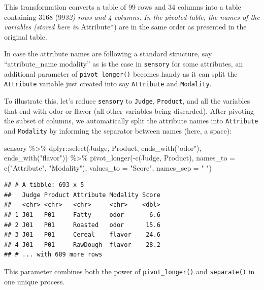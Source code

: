 \documentclass[
]{krantz}
\makeatletter
\newenvironment{Shaded}{\begin{snugshade}}{\end{snugshade}}
\newcommand{\AttributeTok}[1]{\textcolor[rgb]{0.61,0.61,0.61}{#1}}
\newcommand{\FunctionTok}[1]{\textcolor[rgb]{0,0,0}{#1}}
\newcommand{\NormalTok}[1]{#1}
\newcommand{\SpecialCharTok}[1]{\textcolor[rgb]{0,0,0}{#1}}
\newcommand{\StringTok}[1]{\textcolor[rgb]{0.5,0.5,0.5}{#1}}
\newenvironment{kframe}{%
\medskip{}
\setlength{\fboxsep}{.8em}
 \def\at@end@of@kframe{}%
 \ifinner\ifhmode%
  \def\at@end@of@kframe{\end{minipage}}%
  \begin{minipage}{\columnwidth}%
 \fi\fi%
 \def\FrameCommand##1{\hskip\@totalleftmargin \hskip-\fboxsep
 \colorbox{shadecolor}{##1}\hskip-\fboxsep
     \hskip-\linewidth \hskip-\@totalleftmargin \hskip\columnwidth}%
 \MakeFramed {\advance\hsize-\width
   \@totalleftmargin\z@ \linewidth\hsize
   \@setminipage}}%
 {\par\unskip\endMakeFramed%
 \at@end@of@kframe}
\renewenvironment{Shaded}{\begin{kframe}}{\end{kframe}}
\makeatother
\begin{document}
This transformation converts a table of 99 rows and 34 columns into a table containing 3168 (99\emph{32) rows and 4 columns.
In the pivoted table, the names of the variables (stored here in }Attribute*) are in the same order as presented in the original table.

In case the attribute names are following a standard structure, say ``attribute\_name modality'' as is the case in \texttt{sensory} for some attributes, an additional parameter of \texttt{pivot\_longer()} becomes handy as it can split the \texttt{Attribute} variable just created into say \texttt{Attribute} and \texttt{Modality}.

To illustrate this, let's reduce \texttt{sensory} to \texttt{Judge}, \texttt{Product}, and all the variables that end with odor or flavor (all other variables being discarded). After pivoting the subset of columns, we automatically split the attribute names into \texttt{Attribute} and \texttt{Modality} by informing the separator between names (here, a space):

\begin{Shaded}
\begin{Highlighting}[]
\NormalTok{sensory }\SpecialCharTok{\%\textgreater{}\%}
\NormalTok{  dplyr}\SpecialCharTok{::}\FunctionTok{select}\NormalTok{(Judge, Product, }
                \FunctionTok{ends\_with}\NormalTok{(}\StringTok{"odor"}\NormalTok{), }\FunctionTok{ends\_with}\NormalTok{(}\StringTok{"flavor"}\NormalTok{)) }\SpecialCharTok{\%\textgreater{}\%}
  \FunctionTok{pivot\_longer}\NormalTok{(}\SpecialCharTok{{-}}\FunctionTok{c}\NormalTok{(Judge, Product), }
               \AttributeTok{names\_to =} \FunctionTok{c}\NormalTok{(}\StringTok{"Attribute"}\NormalTok{, }\StringTok{"Modality"}\NormalTok{), }
               \AttributeTok{values\_to =} \StringTok{"Score"}\NormalTok{, }\AttributeTok{names\_sep =} \StringTok{" "}\NormalTok{)}
\end{Highlighting}
\end{Shaded}

\begin{verbatim}
## # A tibble: 693 x 5
##   Judge Product Attribute Modality Score
##   <chr> <chr>   <chr>     <chr>    <dbl>
## 1 J01   P01     Fatty     odor       6.6
## 2 J01   P01     Roasted   odor      15.6
## 3 J01   P01     Cereal    flavor    24.6
## 4 J01   P01     RawDough  flavor    28.2
## # ... with 689 more rows
\end{verbatim}

This parameter combines both the power of \texttt{pivot\_longer()} and \texttt{separate()} in one unique process.
\end{document}
